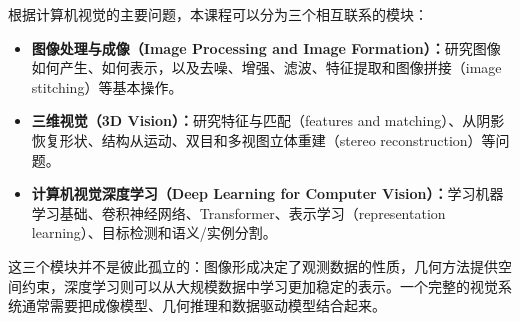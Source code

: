 根据计算机视觉的主要问题，本课程可以分为三个相互联系的模块：

\begin{itemize}
    \item \textbf{图像处理与成像（Image Processing and Image Formation）：}研究图像如何产生、如何表示，以及去噪、增强、滤波、特征提取和图像拼接（image stitching）等基本操作。
    \item \textbf{三维视觉（3D Vision）：}研究特征与匹配（features and matching）、从阴影恢复形状、结构从运动、双目和多视图立体重建（stereo reconstruction）等问题。
    \item \textbf{计算机视觉深度学习（Deep Learning for Computer Vision）：}学习机器学习基础、卷积神经网络、Transformer、表示学习（representation learning）、目标检测和语义/实例分割。
\end{itemize}

这三个模块并不是彼此孤立的：图像形成决定了观测数据的性质，几何方法提供空间约束，深度学习则可以从大规模数据中学习更加稳定的表示。一个完整的视觉系统通常需要把成像模型、几何推理和数据驱动模型结合起来。

